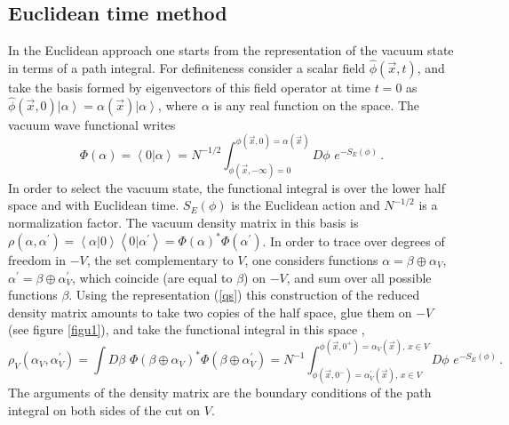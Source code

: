 \documentclass[a4paper]{article}
\begin{document}
\subsection{Euclidean time method}
In the Euclidean approach one starts from the representation of the vacuum state in terms of a path integral.  For definiteness consider a scalar field $\hat{\phi}(\vec{x},t)$, and take the basis formed by eigenvectors of this field operator at time $t=0$ as $\hat{\phi} (\vec{x},0) \left|  \alpha\right>= \alpha(\vec{x})\left|  \alpha\right>$, where $\alpha$ is any real function on the space. The vacuum wave functional writes \cite{book}  
\begin{equation}
\Phi(\alpha)=\left<0|\alpha\right>=N^{-1/2}\int_{\phi(\vec{x},-\infty)= 0}^{\phi(\vec{x},0)=\alpha(\vec{x})} D\phi\,\, e^{-S_E(\phi)}\,. \label{qs}
\end{equation} 
In order to select the vacuum state, the functional integral is over the lower half space and with Euclidean time. $S_E(\phi)$ is the Euclidean action and $N^{-1/2}$ is a normalization factor. The vacuum density matrix in this basis is
$\rho(\alpha,\alpha^\prime)=\left<\alpha | 0\right> \left< 0| \alpha^\prime\right>=\Phi(\alpha)^*\Phi(\alpha^\prime)$. In order to trace over degrees of freedom in $-V$, the set complementary to $V$, one considers functions $\alpha=\beta \oplus \alpha_{V}$, $\alpha^\prime=\beta\oplus \alpha^\prime_{V}$, which coincide (are equal to $\beta$) on $-V$, and sum over all possible functions $\beta$. Using the representation (\ref{qs}) this construction of the reduced density matrix amounts to take two copies of the half space, glue them on $-V$ (see figure \ref{figu1}), and take the functional integral in this space \cite{ci},
\begin{equation}
\rho_V(\alpha_{V},\alpha^\prime_{V})=\int D\beta\,\, \Phi(\beta \oplus \alpha_{V})^* \Phi(\beta\oplus \alpha^\prime_{V})= N^{-1}\int_{\phi(\vec{x},0^-)=\alpha^\prime_V(\vec{x}),\, x\in V }^{\phi(\vec{x},0^+)=\alpha_V(\vec{x}),\,x\in V} D\phi\,\, e^{-S_E(\phi)}\,. \label{opre}
\end{equation}
The arguments of the density matrix are the boundary conditions of the path integral on both sides of the cut on $V$. 
\end{document}
